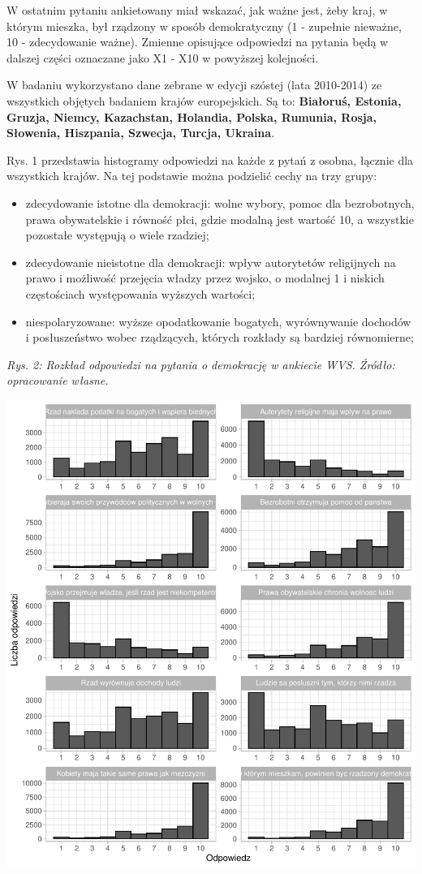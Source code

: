 \documentclass[12pt]{article}
\providecommand{\tightlist}{%
  \setlength{\itemsep}{0pt}\setlength{\parskip}{0pt}}
\begin{document}
W ostatnim pytaniu ankietowany miał wskazać, jak ważne jest, żeby kraj, w którym mieszka, był rządzony w sposób demokratyczny (1 - zupełnie nieważne, 10 - zdecydowanie ważne). Zmienne opisujące odpowiedzi na pytania będą w dalszej części oznaczane jako X1 - X10 w powyższej kolejności.

W badaniu wykorzystano dane zebrane w edycji szóstej (lata 2010-2014) ze wszystkich objętych badaniem krajów europejskich. Są to: \textbf{Białoruś, Estonia, Gruzja, Niemcy, Kazachstan, Holandia, Polska, Rumunia, Rosja, Słowenia, Hiszpania, Szwecja, Turcja, Ukraina}.

Rys. 1 przedstawia histogramy odpowiedzi na każde z pytań z osobna, łącznie dla wszystkich krajów. Na tej podstawie można podzielić cechy na trzy grupy:

\begin{itemize}
\tightlist
\item
  zdecydowanie istotne dla demokracji: wolne wybory, pomoc dla bezrobotnych, prawa obywatelskie i równość płci, gdzie modalną jest wartość 10, a wszystkie pozostałe występują o wiele rzadziej;
\item
  zdecydowanie nieistotne dla demokracji: wpływ autorytetów religijnych na prawo i możliwość przejęcia władzy przez wojsko, o modalnej 1 i niskich częstościach występowania wyższych wartości;
\item
  niespolaryzowane: wyższe opodatkowanie bogatych, wyrównywanie dochodów i posłuszeństwo wobec rządzących, których rozkłady są bardziej równomierne;
\end{itemize}

\emph{Rys. 2: Rozkład odpowiedzi na pytania o demokrację w ankiecie WVS. Źródło: opracowanie własne.}

\begin{center}\includegraphics{text_ASA_files/figure-latex/descr-plot-1} \end{center}
\end{document}

